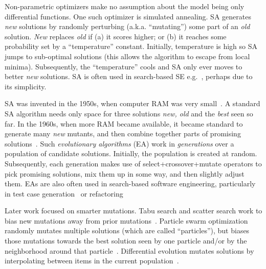 Non-parametric  optimizers   make no assumption
about the model being only differential functions. One such optimizer
is simulated annealing. SA generates {\em new} solutions
 by randomly perturbing (a.k.a. ``mutating'') some part of an {\em old}
 solution.  {\em New} replaces {\em old} if (a) it scores higher; or
 (b) it reaches some probability set by a ``temperature'' constant. Initially,
 temperature is high so SA jumps to sub-optimal solutions (this allows
 the algorithm to escape from local minima). Subsequently, the
 ``temperature'' cools and SA only ever moves to better {\em new}
 solutions. 
 SA is often used in search-based SE
 e.g.~\cite{fea02a,me07f}, perhaps due to its simplicity.

SA was invented   in the 1950s, when
 computer RAM was very small~\cite{kirkpatrick83}. A standard SA algorithm needs
 only space for three solutions {\em new, old} and the {\em best} seen so far.
  In the 1960s, when more RAM became available, it became standard to
 generate many {\em new} mutants, and then combine together parts of
 promising solutions~\cite{goldberg79}.  Such {\em evolutionary
   algorithms} (EA) work in {\em generations} over a population of
 candidate solutions.  Initially, the population is created at random.
 Subsequently, each generation makes use of select+crossover+mutate
 operators to pick promising solutions, mix them up in some way, and
 then slightly adjust them.
 EAs are also often used in search-based
 software engineering, particularly in test case generation~\cite{andrews07,andrews10}
 or refactoring~\cite{Weimer:2009}

 Later work focused on smarter  
 mutations. Tabu search and scatter search
 work to bias new mutations away from prior
 mutations~\cite{Glover1986563,Beausoleil2006426,Molina05sspmo:a,4455350}.
 Particle swarm
 optimization randomly mutates multiple solutions
 (which are called ``particles''), but biases those
 mutations towards the best solution seen by one
 particle and/or by the neighborhood around that
 particle~\cite{pan08}.
 Differential evolution mutates solutions by
 interpolating between items in the current
 population~\cite{storn1997differential}.  
 
 

 
 
